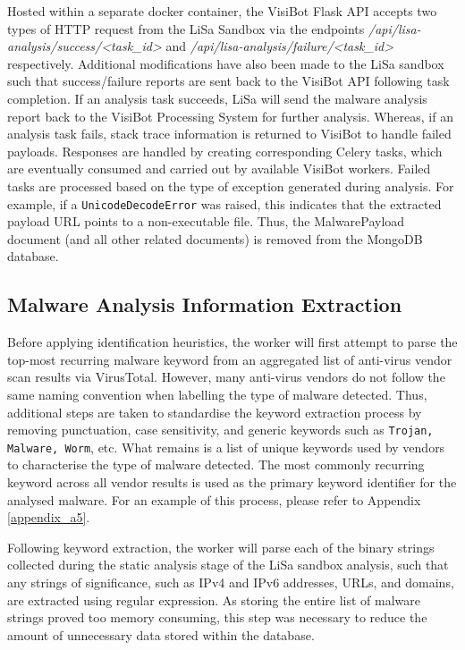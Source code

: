 Hosted within a separate docker container, the VisiBot Flask API accepts two types of HTTP request from the LiSa Sandbox via the endpoints \textit{/api/lisa-analysis/success/<task\_id>} and \textit{/api/lisa-analysis/failure/<task\_id>} respectively. Additional modifications have also been made to the LiSa sandbox such that success/failure reports are sent back to the VisiBot API following task completion. If an analysis task succeeds, LiSa will send the malware analysis report back to the VisiBot Processing System for further analysis. Whereas, if an analysis task fails, stack trace information is returned to VisiBot to handle failed payloads. Responses are handled by creating corresponding Celery tasks, which are eventually consumed and carried out by available VisiBot workers. Failed tasks are processed based on the type of exception generated during analysis. For example, if a \texttt{UnicodeDecodeError} was raised, this indicates that the extracted payload URL points to a non-executable file. Thus, the MalwarePayload document (and all other related documents) is removed from the MongoDB database.

\subsection{Malware Analysis Information Extraction}

Before applying identification heuristics, the worker will first attempt to parse the top-most recurring malware keyword from an aggregated list of anti-virus vendor scan results via VirusTotal. However, many anti-virus vendors do not follow the same naming convention when labelling the type of malware detected. Thus, additional steps are taken to standardise the keyword extraction process by removing punctuation, case sensitivity, and generic keywords such as \texttt{Trojan, Malware, Worm}, etc. What remains is a list of unique keywords used by vendors to characterise the type of malware detected. The most commonly recurring keyword across all vendor results is used as the primary keyword identifier for the analysed malware. For an example of this process, please refer to Appendix \ref{appendix_a5}.

Following keyword extraction, the worker will parse each of the binary strings collected during the static analysis stage of the LiSa sandbox analysis, such that any strings of significance, such as IPv4 and IPv6 addresses, URLs, and domains, are extracted using regular expression. As storing the entire list of malware strings proved too memory consuming, this step was necessary to reduce the amount of unnecessary data stored within the database.

